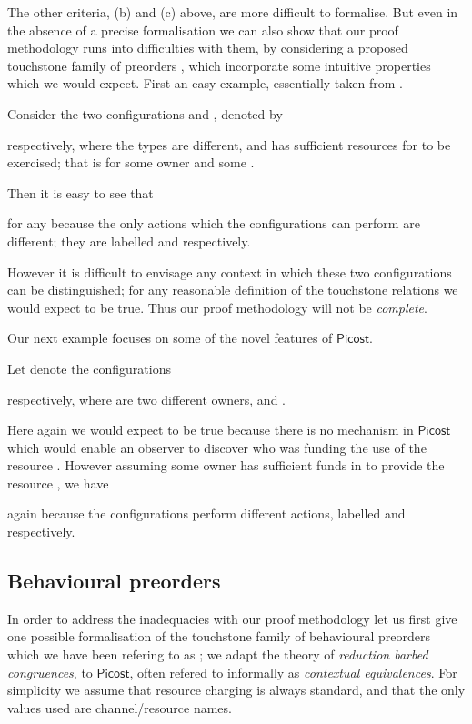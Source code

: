 \documentclass{LMCS}
\newcommand{\pfn}[1]{\mathsf{#1}}  \newcommand{\cfn}[1]{\mathsf{#1}}  \newcommand{\ownfnt}[1]{{\mathsf{#1}}}
\newcommand{\picost}{\ensuremath{\pfn{Picost}}\xspace}
\newcommand{\EndDefBox}{\null\hfill}
\newcommand{\boxHere}{\global\let\EndProof\empty\EndDefBox}
\begin{document}
The other criteria, (b) and (c) above, are more difficult to formalise. But
even in the absence of a precise formalisation we can also show that
our proof methodology  runs into difficulties with them, by
considering a proposed touchstone family of preorders , which incorporate
some intuitive properties which we would expect.
First an easy
example, essentially taken from \cite{pityping}.
\begin{exa}\label{ex:types}
  Consider the two configurations  and , denoted by
  
 respectively, where the types  are different, and  has
  sufficient resources for  to be exercised; that is  for some owner  and some
  .

Then it is easy to see that 

for any  because the only actions which the configurations can perform are different;
they are labelled   and  
 respectively. 

However it is difficult to envisage any  context in which these two
configurations can be distinguished; for any reasonable definition of
the touchstone relations we would expect  to be
true.  Thus our proof methodology will not be \emph{complete}. \boxHere
\end{exa}
Our next example focuses on some of the novel features of \picost.
\begin{exa}\label{ex:own}
  Let  denote the configurations
  
respectively, where  are two different owners, 
and . 

Here again we would expect  to be true because
there is no mechanism in \picost which would enable an observer to discover
who was funding the use of the resource .  However assuming some owner 
has sufficient funds in  to provide the resource , we have

again because the configurations perform different actions, labelled
 and  respectively. \boxHere
\end{exa}

\subsection{Behavioural preorders}

In order to address the inadequacies with our proof methodology let us
first give one possible formalisation of the touchstone family of
behavioural preorders which we have been refering to as 
; we adapt the theory of
\emph{reduction barbed congruences}, \cite{ht92,pibook,pityping} to
\picost, often refered to informally as \emph{contextual equivalences}. 
For simplicity we assume that resource charging is always
standard, and that the only values used are channel/resource names.
\end{document}
